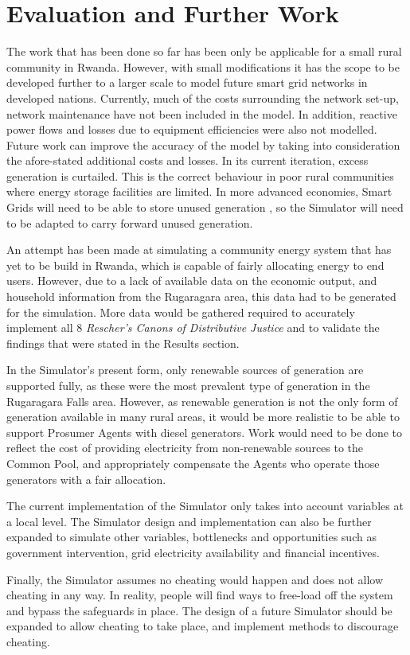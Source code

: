 \chapter{Evaluation and Further Work}
\label{Further Work}

The work that has been done so far has been only be applicable for a small rural community in Rwanda. However, with small modifications it has the scope to be developed further to a larger scale to model future smart grid networks in developed nations. Currently, much of the costs surrounding the network set-up, network maintenance have not been included in the model. In addition, reactive power flows and losses due to equipment efficiencies were also not modelled. Future work can improve the accuracy of the model by taking into consideration the afore-stated additional costs and losses. In its current iteration, excess generation is curtailed. This is the correct behaviour in poor rural communities where energy storage facilities are limited. In more advanced economies, Smart Grids will need to be able to store unused generation \cite{IEEE-SmartGrid:2015}, so the Simulator will need to be adapted to carry forward unused generation.

An attempt has been made at simulating a community energy system that has yet to be build in Rwanda, which is capable of fairly allocating energy to end users. However, due to a lack of available data on the economic output, and household information from the Rugaragara area, this data had to be generated for the simulation. More data would be gathered required to accurately implement all 8 \textit{Rescher's Canons of Distributive Justice} and to validate the findings that were stated in the Results section.

In the Simulator's present form, only renewable sources of generation are supported fully, as these were the most prevalent type of generation in the Rugaragara Falls area. However, as renewable generation is not the only form of generation available in many rural areas, it would be more realistic to be able to support Prosumer Agents with diesel generators. Work would need to be done to reflect the cost of providing electricity from non-renewable sources to the Common Pool, and appropriately compensate the Agents who operate those generators with a fair allocation.

The current implementation of the Simulator only takes into account variables at a local level. The Simulator design and implementation can also be further expanded to simulate other variables, bottlenecks and opportunities such as government intervention, grid electricity availability and financial incentives. 

Finally, the Simulator assumes no cheating would happen and does not allow cheating in any way. In reality, people will find ways to free-load off the system and bypass the safeguards in place. The design of a future Simulator should be expanded to allow cheating to take place, and implement methods to discourage cheating.


